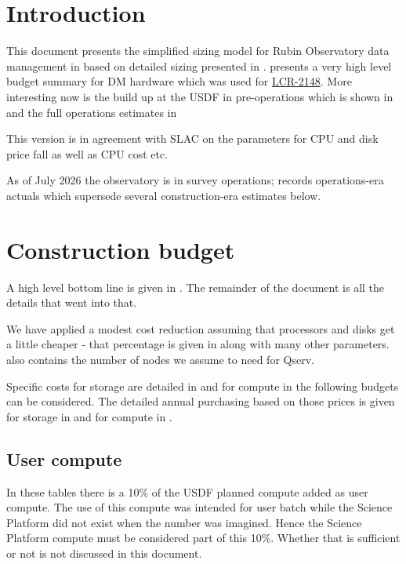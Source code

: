 \section{Introduction}
This document presents the simplified
  sizing model for Rubin Observatory data management  in  based on detailed sizing presented in .
 presents a very high level budget summary for
DM hardware which was used for \href{https://project.lsst.org/groups/ccb/node/3889}{LCR-2148}.
More interesting now is the build up at the USDF in pre-operations which is shown in 
and the full operations estimates in 

This version is in agreement with SLAC on the parameters for CPU and disk price fall as well as CPU cost etc.

As of July 2026 the observatory is in survey operations;  records operations-era actuals which supersede several construction-era estimates below.



\section{Construction  budget}\label{sec:cost}

A high level bottom line is given in .
The remainder of the document is all the details that went into that.



We have applied a modest cost reduction assuming that processors  and disks get a little cheaper - that
percentage is given in  along with many other parameters.  also contains the number of nodes we assume to need for Qserv.

Specific  costs for storage are detailed in  and for compute in 
the following budgets can be considered. The detailed annual purchasing based on those prices is given for
storage in  and for compute in .

\subsection{User compute}
In these tables there is a 10\%  of the USDF planned compute added as user compute.
The use of this compute was intended for user batch while the Science Platform did not exist when the number was imagined.
Hence the Science Platform compute must be considered part of this 10\%.
Whether that is sufficient or not is not discussed in this document.

